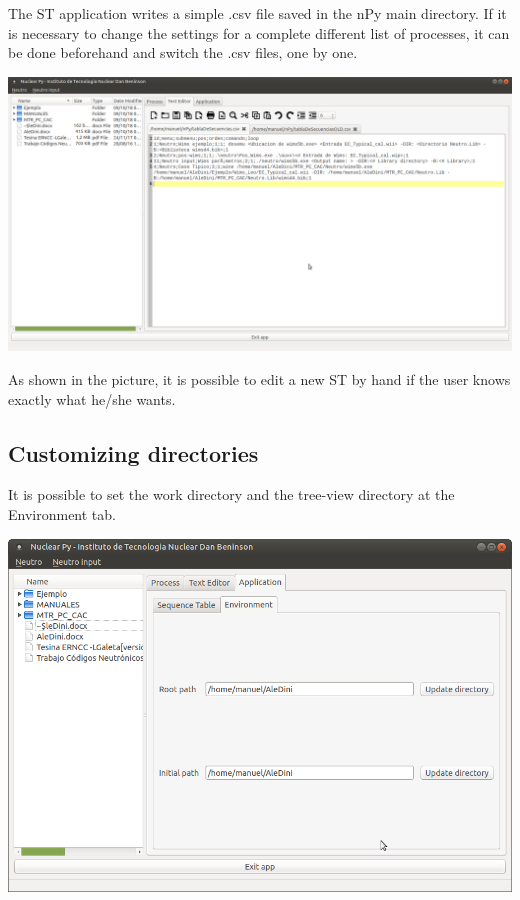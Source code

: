 \documentclass[a4paper,10pt]{article}
\begin{document}
The ST application writes a simple .csv file saved in the nPy main directory. If it is necessary to change the settings for a complete different list of processes, it can be done beforehand and switch the .csv files, one by one.

\begin{center}
 \includegraphics[width=\textwidth]{img/tablaDeSecuenciasConfig.png}
\end{center}

As shown in the picture, it is possible to edit a new ST by hand if the user knows exactly what he/she wants.

\subsection{Customizing directories}

It is possible to set the work directory and the tree-view directory at the Environment tab.

 \begin{center}
 \includegraphics[width=\textwidth]{img/environment.png}
\end{center}
\end{document}
